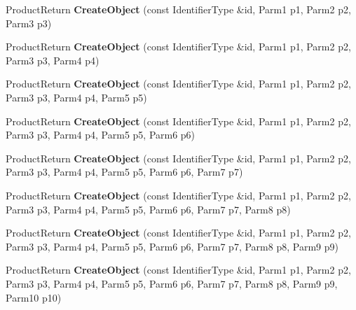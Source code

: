 \begin{DoxyCompactItemize}
\item 
\hypertarget{classLoki_1_1CachedFactory_a6fb625b45e7672fcd0715f782981c600}{}Product\+Return {\bfseries Create\+Object} (const Identifier\+Type \&id, Parm1 p1, Parm2 p2, Parm3 p3)\label{classLoki_1_1CachedFactory_a6fb625b45e7672fcd0715f782981c600}

\item 
\hypertarget{classLoki_1_1CachedFactory_aaf6df3387bdcd35da141d43afd3062a8}{}Product\+Return {\bfseries Create\+Object} (const Identifier\+Type \&id, Parm1 p1, Parm2 p2, Parm3 p3, Parm4 p4)\label{classLoki_1_1CachedFactory_aaf6df3387bdcd35da141d43afd3062a8}

\item 
\hypertarget{classLoki_1_1CachedFactory_a54a3cd2b88a0f033877ad825d450964d}{}Product\+Return {\bfseries Create\+Object} (const Identifier\+Type \&id, Parm1 p1, Parm2 p2, Parm3 p3, Parm4 p4, Parm5 p5)\label{classLoki_1_1CachedFactory_a54a3cd2b88a0f033877ad825d450964d}

\item 
\hypertarget{classLoki_1_1CachedFactory_af497ffeaa7da0a5cadafa16a8f7e885c}{}Product\+Return {\bfseries Create\+Object} (const Identifier\+Type \&id, Parm1 p1, Parm2 p2, Parm3 p3, Parm4 p4, Parm5 p5, Parm6 p6)\label{classLoki_1_1CachedFactory_af497ffeaa7da0a5cadafa16a8f7e885c}

\item 
\hypertarget{classLoki_1_1CachedFactory_a93f6b4b9dce6b893f11d6a0556b4b3d5}{}Product\+Return {\bfseries Create\+Object} (const Identifier\+Type \&id, Parm1 p1, Parm2 p2, Parm3 p3, Parm4 p4, Parm5 p5, Parm6 p6, Parm7 p7)\label{classLoki_1_1CachedFactory_a93f6b4b9dce6b893f11d6a0556b4b3d5}

\item 
\hypertarget{classLoki_1_1CachedFactory_a26df27099d401ffd3af592f92747e969}{}Product\+Return {\bfseries Create\+Object} (const Identifier\+Type \&id, Parm1 p1, Parm2 p2, Parm3 p3, Parm4 p4, Parm5 p5, Parm6 p6, Parm7 p7, Parm8 p8)\label{classLoki_1_1CachedFactory_a26df27099d401ffd3af592f92747e969}

\item 
\hypertarget{classLoki_1_1CachedFactory_af6347d97a47a204ed2bea8a617a19eaf}{}Product\+Return {\bfseries Create\+Object} (const Identifier\+Type \&id, Parm1 p1, Parm2 p2, Parm3 p3, Parm4 p4, Parm5 p5, Parm6 p6, Parm7 p7, Parm8 p8, Parm9 p9)\label{classLoki_1_1CachedFactory_af6347d97a47a204ed2bea8a617a19eaf}

\item 
\hypertarget{classLoki_1_1CachedFactory_a274f4e69369cabfe3ed7c098306718f9}{}Product\+Return {\bfseries Create\+Object} (const Identifier\+Type \&id, Parm1 p1, Parm2 p2, Parm3 p3, Parm4 p4, Parm5 p5, Parm6 p6, Parm7 p7, Parm8 p8, Parm9 p9, Parm10 p10)\label{classLoki_1_1CachedFactory_a274f4e69369cabfe3ed7c098306718f9}


\end{DoxyCompactItemize}

